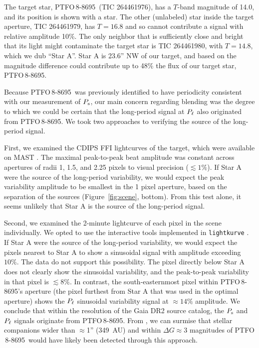 \documentclass[12pt,twocolumn,tighten]{aastex62}
\newcommand{\ptfo}{PTFO$\,$8-8695}
\begin{document}
The target star, \ptfo\ (TIC 264461976), has a $T$-band magnitude of
14.0, and its position is shown with a star.  The other (unlabeled)
star inside the target aperture, TIC 264461979, has $T=16.8$ and so
cannot contribute a signal with relative amplitude 10\%.  The only
neighbor that is sufficiently close and bright that its light might
contaminate the target star is TIC 264461980, with $T=14.8$, which we
dub ``Star A''.  Star A is 23.6'' NW of our target, and based on the
magnitude difference could contribute up to 48\% the flux of our
target star, \ptfo.  

Because \ptfo\ was previously identified to have periodicity
consistent with our measurement of $P_{\rm s}$, our main concern
regarding blending was the degree to which we could be certain that
the long-period signal at $P_{\rm \ell}$ also originated from \ptfo.
We took two approaches to verifying the source of the long-period
signal.

First, we examined the CDIPS FFI lightcurves of the target, which were
available on MAST \citep{bouma_cluster_2019}.  The maximal
peak-to-peak beat amplitude was constant across apertures of radii 1,
1.5, and 2.25 pixels to visual precision ($\lesssim 1\%$).  If Star A
were the source of the long-period variability, we would expect the
peak variability amplitude to be smallest in the 1 pixel aperture,
based on the separation of the sources (Figure~\ref{fig:scene},
bottom).  From this test alone, it seems unlikely that Star A is the
source of the long-period signal.

Second, we examined the 2-minute lightcurve of each pixel in the scene
individually.  We opted to use the interactive tools implemented in
\texttt{lightkurve} \citep{lightkurve_2018}.  If Star A were the
source of the long-period variability, we would expect the pixels
nearest to Star A to show a sinusoidal signal with amplitude exceeding
$10\%$.  The data do not support this possibility.  The pixel directly
below Star A does not clearly show the sinusoidal variability, and the
peak-to-peak variability in that pixel is $\lesssim 8\%$.  In
contrast, the south-easternmost pixel within \ptfo's aperture (the
pixel furthest from Star A that was used in the optimal aperture)
shows the $P_{\rm \ell}$ sinusoidal variability signal at $\approx
14\%$ amplitude.  We conclude that within the resolution of the Gaia
DR2 source catalog, the $P_{\rm s}$ and $P_{\rm \ell}$ signals
originate from \ptfo.  From \citet{ziegler_measuring_2018}, we can
surmise that stellar companions wider than $\approx$1'' (349~AU) and
within $\Delta G \approx 3$ magnitudes of \ptfo\ would have likely
been detected through this approach. 
\end{document}
